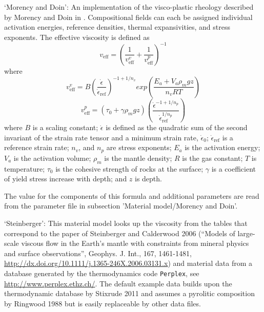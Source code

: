 \begin{itemize}
`Morency and Doin': An implementation of the visco-plastic rheology described by Morency and Doin in \cite{MD04}. Compositional fields can each be assigned individual activation energies, reference densities, thermal expansivities, and stress exponents. The effective viscosity is defined as \[v_\text{eff} = \left(\frac{1}{v_\text{eff}^v}+\frac{1}{v_\text{eff}^p}\right)^{-1}\] where \[v_\text{eff}^v = B \left(\frac{\dot{\epsilon}}{\dot{\epsilon}_\text{ref}} \right)^{-1+1/n_v} exp\left(\frac{E_a +V_a \rho_m g z}{n_v R T}\right) \] \[v_\text{eff}^p = (\tau_0 + \gamma \rho_m g z) \left( \frac{\dot{\epsilon}^{-1+1/n_p}} {\dot{\epsilon}_\text{ref}^{1/n_p}} \right) \] where $B$ is a scaling constant; $\dot{\epsilon}$ is defined as the quadratic sum of the second invariant of the strain rate tensor and a minimum strain rate, $\dot{\epsilon}_0$; $\dot{\epsilon}_\text{ref}$ is a reference strain rate; $n_v$, and $n_p$ are stress exponents; $E_a$ is the activation energy; $V_a$ is the activation volume; $\rho_m$ is the mantle density; $R$ is the gas constant; $T$ is temperature; $\tau_0$ is the cohesive strength of rocks at the surface; $\gamma$ is a coefficient of yield stress increase with depth; and $z$ is depth. 


The value for the components of this formula and additional parameters are read from the parameter file in subsection 'Material model/Morency and Doin'.

`Steinberger': This material model looks up the viscosity from the tables that correspond to the paper of Steinberger and Calderwood 2006 (``Models of large-scale viscous flow in the Earth's mantle with constraints from mineral physics and surface observations'', Geophys. J. Int., 167, 1461-1481, \url{http://dx.doi.org/10.1111/j.1365-246X.2006.03131.x}) and material data from a database generated by the thermodynamics code \texttt{Perplex}, see \url{http://www.perplex.ethz.ch/}. The default example data builds upon the thermodynamic database by Stixrude 2011 and assumes a pyrolitic composition by Ringwood 1988 but is easily replaceable by other data files. 


\end{itemize}
